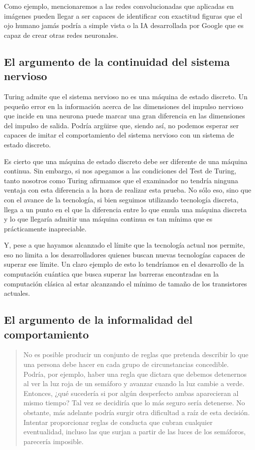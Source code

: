 \documentclass[12pt,a4paper]{article}
\begin{document}
Como ejemplo, mencionaremos a las redes convolucionadas que aplicadas en imágenes pueden llegar a ser capaces de identificar con exactitud figuras que el ojo humano jamás podría a simple vista o la IA desarrollada por Google que es capaz de crear otras redes neuronales.

\subsection{El argumento de la continuidad del sistema nervioso}
Turing admite que el sistema nervioso no es una máquina de estado discreto. Un pequeño error en la información acerca de las dimensiones del impulso nervioso que incide en una neurona puede marcar una gran diferencia en las dimensiones del impulso de salida. Podría argüirse que, siendo así, no podemos esperar ser capaces de imitar el comportamiento del sistema nervioso con un sistema de estado discreto.

Es cierto que una máquina de estado discreto debe ser diferente de una máquina continua. Sin embargo, si nos apegamos a las condiciones del Test de Turing, tanto nosotros como Turing afirmamos que el examinador no tendría ninguna ventaja con esta diferencia a la hora de realizar esta prueba. No sólo eso, sino que con el avance de la tecnología, si bien seguimos utilizando tecnología discreta, llega a un punto en el que la diferencia entre lo que emula una máquina discreta y lo que llegaría admitir una máquina continua es tan mínima que es prácticamente inapreciable.

Y, pese a que hayamos alcanzado el límite que la tecnología actual nos permite, eso no limita a los desarrolladores quienes buscan nuevas tecnologías capaces de superar ese límite. Un claro ejemplo de esto lo tendríamos en el desarrollo de la computación cuántica que busca superar las barreras encontradas en la computación clásica al estar alcanzando el mínimo de tamaño de los transistores actuales.


\subsection{El argumento de la informalidad del comportamiento}
\begin{quote}\small No es posible producir un conjunto de reglas que pretenda describir lo que
una persona debe hacer en cada grupo de circunstancias concedible. Podría, por ejemplo, haber una regla que dictara que debemos detenernos al ver la luz roja de un semáforo y avanzar cuando la luz cambie a verde. Entonces, ¿qué sucedería si por algún desperfecto ambas aparecieran al
mismo tiempo? Tal vez se decidiría que lo más seguro sería detenerse. No
obstante, más adelante podría surgir otra dificultad a raíz de esta decisión.
Intentar proporcionar reglas de conducta que cubran cualquier eventualidad, incluso las que surjan a partir de las luces de los semáforos, parecería imposible.
\end{quote}
\end{document}
